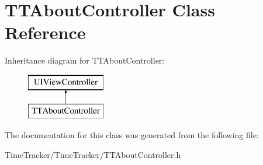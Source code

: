 \hypertarget{interface_t_t_about_controller}{\section{T\-T\-About\-Controller Class Reference}
\label{interface_t_t_about_controller}
}
Inheritance diagram for T\-T\-About\-Controller\-:\begin{figure}[H]
\begin{center}
\leavevmode
\includegraphics[height=2.000000cm]{interface_t_t_about_controller}
\end{center}
\end{figure}


The documentation for this class was generated from the following file\-:\begin{DoxyCompactItemize}
\item 
Time\-Tracker/\-Time\-Tracker/T\-T\-About\-Controller.\-h\end{DoxyCompactItemize}
